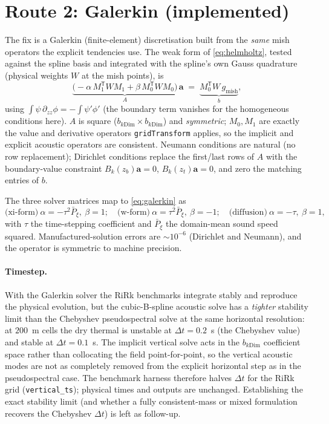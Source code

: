 \documentclass[11pt]{article}
\begin{document}
\section{Route 2: Galerkin (implemented)}

The fix is a Galerkin (finite-element) discretisation built from the
\emph{same} mish operators the explicit tendencies use. The weak form of
\eqref{eq:helmholtz}, tested against the spline basis and integrated with the
spline's own Gauss quadrature (physical weights $W$ at the mish points), is
\begin{equation}
  \underbrace{\bigl(-\alpha\,M_1^{\mathsf T}W M_1 + \beta\,M_0^{\mathsf T}W M_0\bigr)}_{A}\,
  \mathbf{a}
  \;=\;
  \underbrace{M_0^{\mathsf T} W\,g_{\text{mish}}}_{b},
  \label{eq:galerkin}
\end{equation}
using $\int\psi\,\partial_{zz}\phi = -\int\psi'\phi'$ (the boundary term vanishes
for the homogeneous conditions here). $A$ is square ($b_{k\mathrm{Dim}}\times
b_{k\mathrm{Dim}}$) and \emph{symmetric}; $M_0,M_1$ are exactly the value and
derivative operators \texttt{gridTransform} applies, so the implicit and explicit
acoustic operators are consistent. Neumann conditions are natural (no row
replacement); Dirichlet conditions replace the first/last rows of $A$ with the
boundary-value constraint $B_k(z_b)\mathbf a=0$, $B_k(z_t)\mathbf a=0$, and zero
the matching entries of $b$.

The three solver matrices map to \eqref{eq:galerkin} as
\[
  \text{(xi-form)}\ \alpha=-\tau^2\bar P_\xi,\ \beta=1;\quad
  \text{(w-form)}\ \alpha=\tau^2\bar P_\xi,\ \beta=-1;\quad
  \text{(diffusion)}\ \alpha=-\tau,\ \beta=1,
\]
with $\tau$ the time-stepping coefficient and $\bar P_\xi$ the domain-mean sound
speed squared. Manufactured-solution errors are $\sim10^{-6}$ (Dirichlet and
Neumann), and the operator is symmetric to machine precision.

\paragraph{Timestep.} With the Galerkin solver the RiRk benchmarks integrate
stably and reproduce the physical evolution, but the cubic-B-spline acoustic
solve has a \emph{tighter} stability limit than the Chebyshev pseudospectral
solve at the same horizontal resolution: at $200$~m cells the dry thermal is
unstable at $\Delta t=0.2$~s (the Chebyshev value) and stable at $\Delta
t=0.1$~s. The implicit vertical solve acts in the $b_{k\mathrm{Dim}}$ coefficient
space rather than collocating the field point-for-point, so the vertical acoustic
modes are not as completely removed from the explicit horizontal step as in the
pseudospectral case. The benchmark harness therefore halves $\Delta t$ for the
RiRk grid (\texttt{vertical\_ts}); physical times and outputs are unchanged.
Establishing the exact stability limit (and whether a fully consistent-mass or
mixed formulation recovers the Chebyshev $\Delta t$) is left as follow-up.
\end{document}
